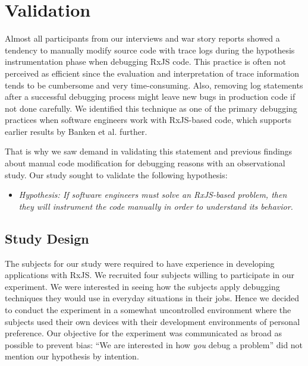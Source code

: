 \documentclass[sigplan,screen,review]{acmart}
\begin{document}
\section{Validation}
\label{sec:study}

Almost all participants from our interviews and war story reports showed a tendency to manually modify source code with trace logs during the hypothesis instrumentation phase when debugging RxJS code. This practice is often not perceived as efficient since the evaluation and interpretation of trace information tends to be cumbersome and very time-consuming. Also, removing log statements after a successful debugging process might leave new bugs in production code if not done carefully. We identified this technique as one of the primary debugging practices when software engineers work with RxJS-based code, which supports earlier results by Banken et al. \cite{10.1145/3180155.3180156} further.

That is why we saw demand in validating this statement and previous findings about manual code modification for debugging reasons with an observational study. Our study sought to validate the following hypothesis:

\begin{itemize}
	\item \emph{Hypothesis: If software engineers must solve an RxJS-based problem, then they will instrument the code manually in order to understand its behavior.}
\end{itemize}

\subsection{Study Design}

The subjects for our study were required to have experience in developing applications with RxJS. We recruited four subjects willing to participate in our experiment. We were interested in seeing how the subjects apply debugging techniques they would use in everyday situations in their jobs. Hence we decided to conduct the experiment in a somewhat uncontrolled environment where the subjects used their own devices with their development environments of personal preference. Our objective for the experiment was communicated as broad as possible to prevent bias: ``We are interested in how \emph{you} debug a problem'' did not mention our hypothesis by intention.
\end{document}

